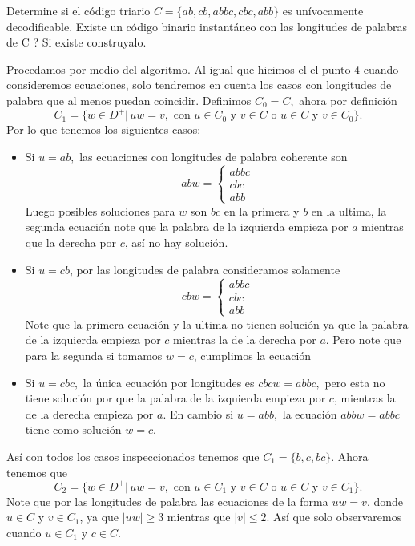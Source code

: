 
Determine si el código triario $C = \{ab, cb, abbc, cbc, abb\}$ es unívocamente decodificable. Existe un código binario instantáneo con las longitudes de palabras de C ? Si existe construyalo.

\begin{sols}
    Procedamos por medio del algoritmo. Al igual que hicimos el el punto 4 cuando consideremos ecuaciones, solo tendremos en cuenta los casos con longitudes de palabra que al menos puedan coincidir. Definimos $C_0=C,$ ahora por definición
    $$C_1=\{w\in D^+|\,uw=v, \text{ con } u\in C_0 \text{ y } v\in C \text{ o } u\in C \text{ y } v\in C_0 \}.$$
    Por lo que tenemos los siguientes casos:
    \begin{itemize}
        \item Si $u=ab,$ las ecuaciones con longitudes de palabra coherente son
        $$abw=\begin{cases}
            abbc\\
            cbc\\
            abb
        \end{cases}$$ 
        Luego posibles soluciones para $w$ son $bc$ en la primera y $b$ en la ultima, la segunda ecuación note que la palabra de la izquierda empieza por $a$ mientras que la derecha por $c$, así no hay solución.
        \item Si $u=cb$, por las longitudes de palabra consideramos solamente
        $$cbw=\begin{cases}
            abbc\\
            cbc\\
            abb
        \end{cases}$$
        Note que la primera ecuación y la ultima no tienen solución ya que la palabra de la izquierda empieza por $c$ mientras la de la derecha por $a.$ Pero note que para la segunda si tomamos $w=c$, cumplimos la ecuación
        \item Si $u=cbc,$ la única ecuación por longitudes es $cbcw=abbc,$ pero esta no tiene solución por que la palabra de la izquierda empieza por $c$, mientras la de la derecha empieza por $a$. En cambio si $u=abb,$ la ecuación $abbw=abbc$ tiene como solución $w=c.$
    \end{itemize}
    Así con todos los casos inspeccionados tenemos que $C_1=\{b,c,bc\}.$ Ahora tenemos que 
    $$C_2=\{w\in D^+|\,uw=v, \text{ con } u\in C_1 \text{ y } v\in C \text{ o } u\in C \text{ y } v\in C_1 \}.$$
    Note que por las longitudes de palabra las ecuaciones de la forma $uw=v$, donde $u\in C$ y $v\in C_1$, ya que $|uw|\geq 3$ mientras que $|v|\leq 2.$ Así que solo observaremos cuando $u\in C_1$ y $c\in C$.

\end{sols}
